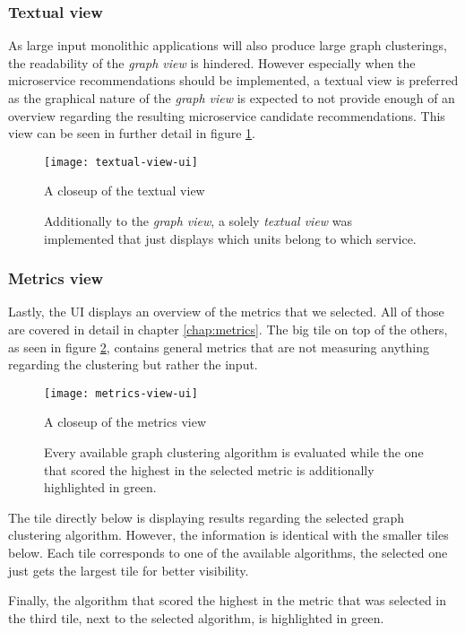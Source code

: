 \documentclass[12pt,a4paper]{report}
\begin{document}
\subsubsection{Textual view}
As large input monolithic applications will also produce large graph clusterings,
the readability of the \textit{graph view} is hindered.
However especially when the microservice recommendations should
be implemented, a textual view is preferred as the graphical nature of the
\textit{graph view} is expected to not provide enough of an overview regarding
the resulting microservice candidate recommendations.
This view can be seen in further detail in figure \ref{fig:textual-view-ui}.

\begin{figure}[htbp]
\centering
\texttt{[image: textual-view-ui]}
\caption{A closeup of the textual view}
\caption*{\centering
  Additionally to the \textit{graph view}, a solely \textit{textual view}
  was implemented that just displays which units belong to which service.
}
\label{fig:textual-view-ui}
\end{figure}


\subsubsection{Metrics view}
Lastly, the UI displays an overview of the metrics that we selected.
All of those are covered in detail in chapter \ref{chap:metrics}.
The big tile on top of the others, as seen in figure \ref{fig:metrics-view-ui},
contains general metrics that are not measuring anything regarding the
clustering but rather the input.

\begin{figure}[htbp]
\centering
\texttt{[image: metrics-view-ui]}
\caption{A closeup of the metrics view}
\caption*{\centering
  Every available graph clustering algorithm is evaluated while the one that
  scored the highest in the selected metric is additionally highlighted in green.
}
\label{fig:metrics-view-ui}
\end{figure}

The tile directly below is displaying results regarding the selected
graph clustering algorithm. However, the information is identical with the
smaller tiles below. Each tile corresponds to one of the available algorithms,
the selected one just gets the largest tile for better visibility.

Finally, the algorithm that scored the highest in the metric that was selected
in the third tile, next to the selected algorithm, is highlighted in green.
\end{document}
